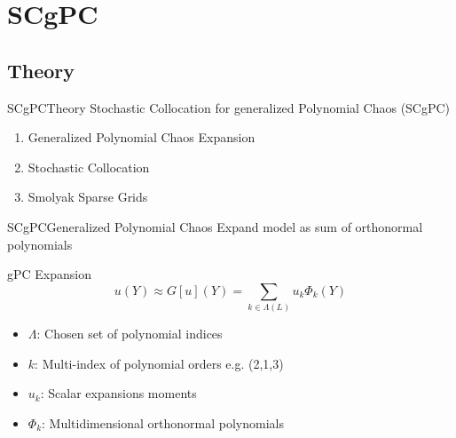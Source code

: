 \documentclass{beamer}
\begin{document}
\AtBeginSubsection[]
{\begin{frame}[shrink=20,noframenumbering]{Outline}\vspace{-20pt}
  \begin{columns}
    \begin{column}{0.1\textwidth}
    \end{column}
    \begin{column}{0.9\textwidth}
      \setcounter{tocdepth}{2}
      \tableofcontents[currentsection,currentsubsection,subsectionstyle=show/shaded/hide]%
    \end{column}
  \end{columns}
\end{frame}
}






\section{SCgPC}
\subsection{Theory}
\begin{frame}{SCgPC}{Theory}\vspace{-20pt}
  \vfill
  Stochastic Collocation for generalized Polynomial Chaos (SCgPC)
  \vfill
  \begin{enumerate}
    \item Generalized Polynomial Chaos Expansion
  \vfill
    \item Stochastic Collocation
  \vfill
    \item Smolyak Sparse Grids
  \end{enumerate}
  \vfill
\end{frame}

\begin{frame}{SCgPC}{Generalized Polynomial Chaos}\vspace{-20pt}
  \vfill
  Expand model as sum of orthonormal polynomials
  \vfill
  \begin{block}{gPC Expansion}
    \begin{equation*}
    u(Y) \approx G[u](Y) = \sum_{k\in\Lambda(L)} u_k \Phi_k(Y)
    \end{equation*}
  \end{block}
  \vfill
  \begin{itemize}
    \item $\Lambda$: Chosen set of polynomial indices
    \item $k$: Multi-index of polynomial orders e.g. (2,1,3)
    \item $u_k$: Scalar expansions moments
    \item $\Phi_k$: Multidimensional orthonormal polynomials
  \end{itemize}
  \vfill
\end{frame}
\end{document}
